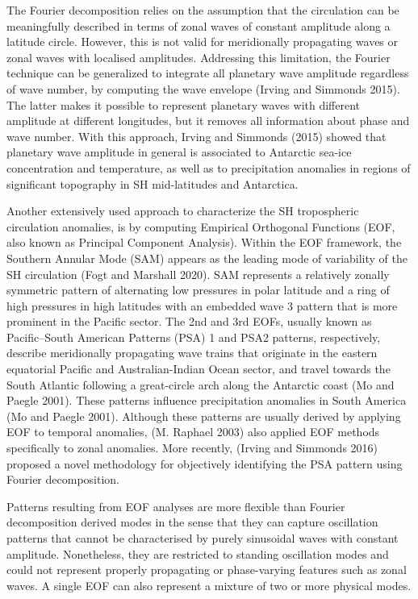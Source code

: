 \documentclass[smallextended]{svjour3}       %
\begin{document}
The Fourier decomposition relies on the assumption that the circulation can be meaningfully described in terms of zonal waves of constant amplitude along a latitude circle.
However, this is not valid for meridionally propagating waves or zonal waves with localised amplitudes.
Addressing this limitation, the Fourier technique can be generalized to integrate all planetary wave amplitude regardless of wave number, by computing the wave envelope (Irving and Simmonds 2015).
The latter makes it possible to represent planetary waves with different amplitude at different longitudes, but it removes all information about phase and wave number.
With this approach, Irving and Simmonds (2015) showed that planetary wave amplitude in general is associated to Antarctic sea-ice concentration and temperature, as well as to precipitation anomalies in regions of significant topography in SH mid-latitudes and Antarctica.

Another extensively used approach to characterize the SH tropospheric circulation anomalies, is by computing Empirical Orthogonal Functions (EOF, also known as Principal Component Analysis).
Within the EOF framework, the Southern Annular Mode (SAM) appears as the leading mode of variability of the SH circulation (Fogt and Marshall 2020).
SAM represents a relatively zonally symmetric pattern of alternating low pressures in polar latitude and a ring of high pressures in high latitudes with an embedded wave 3 pattern that is more prominent in the Pacific sector.
The 2nd and 3rd EOFs, usually known as Pacific--South American Patterns (PSA) 1 and PSA2 patterns, respectively, describe meridionally propagating wave trains that originate in the eastern equatorial Pacific and Australian-Indian Ocean sector, and travel towards the South Atlantic following a great-circle arch along the Antarctic coast (Mo and Paegle 2001).
These patterns influence precipitation anomalies in South America (Mo and Paegle 2001).
Although these patterns are usually derived by applying EOF to temporal anomalies, (M. Raphael 2003) also applied EOF methods specifically to zonal anomalies.
More recently, (Irving and Simmonds 2016) proposed a novel methodology for objectively identifying the PSA pattern using Fourier decomposition.

Patterns resulting from EOF analyses are more flexible than Fourier decomposition derived modes in the sense that they can capture oscillation patterns that cannot be characterised by purely sinusoidal waves with constant amplitude.
Nonetheless, they are restricted to standing oscillation modes and could not represent properly propagating or phase-varying features such as zonal waves.
A single EOF can also represent a mixture of two or more physical modes.
\end{document}
